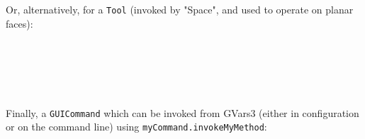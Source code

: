 \documentclass[a4paper,10pt]{report}
\begin{document}
Or, alternatively, for a \texttt{Tool} (invoked by "Space", and used to operate on planar faces):

\vspace{10pt}
\noindent
\ttfamily
\hlstd{}\hlstd{}\hlopt{(\ }\hlopt{,\ }\hlstd{}\hlstd{}\hlopt{,\ }\hlstd{}\hlstd{}\hlopt{,\ );}\\
\hlstd{}\hlopt{::}\hlstd{}\hlstd{}\hlopt{()\ \usebox{\hlboxopenbrace}}\\
\hlstd{}\hlstd{\ \ \ \ }\hlopt{::}\hlstd{}\hlstd{}\hlopt{(\ }\hlstd{}\hlstd{\ }\hlopt{);}\\
\hlstd{}\hlopt{\usebox{\hlboxclosebrace}}\hlstd{}\\
\mbox{}
\normalfont
\normalsize

Finally, a \texttt{GUICommand} which can be invoked from GVars3 (either in configuration or on the command line) using \texttt{myCommand.invokeMyMethod}:

\vspace{10pt}
\noindent
\ttfamily
\hlstd{}\hlstd{}\hlopt{(\ }\hlopt{,\ }\hlopt{,\ );}\\
\hlstd{}\hlopt{::}\hlstd{}\hlstd{}\hlopt{(\ }\hlopt{)\ \usebox{\hlboxopenbrace}}\\
\hlstd{}\hlstd{\ \ \ \ }\hlstd{}\\
\hlstd{}\hlopt{\usebox{\hlboxclosebrace}}\hlstd{}\\
\mbox{}
\normalfont
\normalsize
\end{document}
